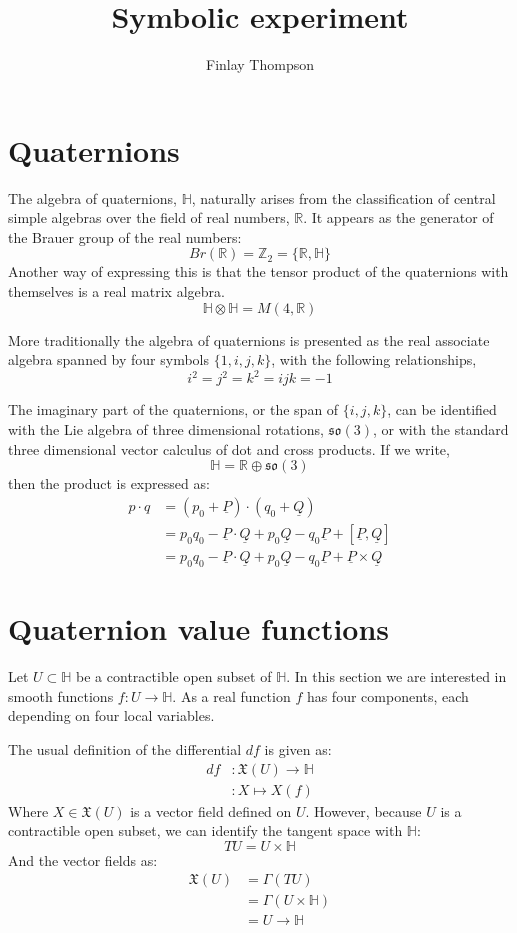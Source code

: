 \documentclass{amsart}
\title{Symbolic experiment}
\author{Finlay Thompson}
\providecommand{\Z}{\mathbb{Z}}
\providecommand{\R}{\mathbb{R}}
\providecommand{\HH}{\mathbb{H}}
\providecommand{\so}{\mathfrak{so}}
\renewcommand{\P}{\underline{P}}
\newcommand{\Q}{\underline{Q}}
\newcommand{\1}{\boldsymbol{1}}
\begin{document}
\maketitle

\section{Quaternions}

The algebra of quaternions, $\HH$, naturally arises from the classification of
central simple algebras over the field of real numbers, $\R$. It appears as the
generator of the Brauer group of the real numbers:
$$ Br(\R) = \Z_2 = \{\R, \HH\} $$
Another way of expressing this is that the tensor product of the quaternions
with themselves is a real matrix algebra.
$$ \HH\otimes\HH = M(4, \R) $$

More traditionally the algebra of quaternions is presented as the real associate
algebra spanned by four symbols $\{1,i,j,k\}$, with the following relationships,
$$ i^2 = j ^2 = k^2 = ijk = -1 $$

The imaginary part of the quaternions, or the span of $\{i,j,k\}$, can be
identified with the Lie algebra of three dimensional rotations, $\so(3)$, or
with the standard three dimensional vector calculus of dot and cross products.
If we write,
$$ \HH = \R \oplus \so(3) $$
then the product is expressed as:
\begin{align*}
  p \cdot q &= (p_0 + \P) \cdot (q_0 + \Q) \\
            &= p_0q_0 - \P\cdot \Q + p_0\Q - q_0\P + [\P,\Q] \\
            &= p_0q_0 - \P\cdot \Q + p_0\Q - q_0\P + \P\times \Q
\end{align*}


\section{Quaternion value functions}

Let $U\subset\HH$ be a contractible open subset of $\HH$. In this section we are
interested in smooth functions $f : U \to \HH$. As a real function $f$ has four
components, each depending on four local variables.

The usual definition of the differential $df$ is given as:
\begin{align*}
  df &: \mathfrak{X}(U) \to \HH \\
     &: X \mapsto X(f)
\end{align*}
Where $X \in \mathfrak{X}(U)$ is a vector field defined on $U$. However, because
$U$ is a contractible open subset, we can identify the tangent space with $\HH$:
$$ TU = U \times \HH $$
And the vector fields as:
\begin{align*}
\mathfrak{X}(U)
    &= \Gamma(TU) \\
    &= \Gamma(U \times \HH) \\
    &= U \to \HH
\end{align*}
\end{document}

